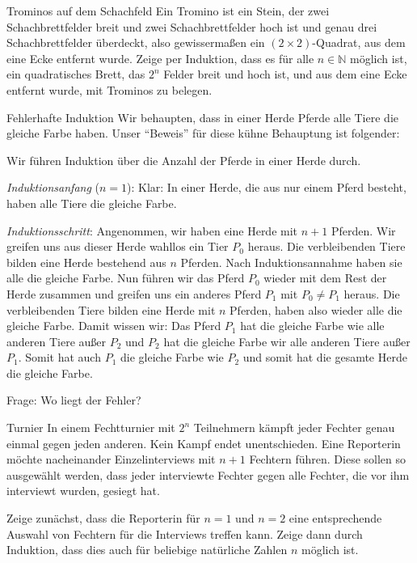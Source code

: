 \documentclass{uebungszettel}
\newcommand{\N}{\mathbb{N}} %
\begin{document}
\newpage

\begin{aufgabe}{Trominos auf dem Schachfeld}
  Ein Tromino ist ein Stein, der zwei Schachbrettfelder breit und zwei Schachbrettfelder hoch ist und genau drei Schachbrettfelder überdeckt, also gewissermaßen ein $(2 \times 2)$-Quadrat, aus dem eine Ecke entfernt wurde. Zeige per Induktion, dass es für alle $n \in \N$ möglich ist, ein quadratisches Brett, das $2^n$ Felder breit und hoch ist, und aus dem eine Ecke entfernt wurde, mit Trominos zu belegen.
\end{aufgabe}

\begin{aufgabe}{Fehlerhafte Induktion}
  Wir behaupten, dass in einer Herde Pferde alle Tiere die gleiche Farbe haben. Unser "`Beweis"' für diese kühne Behauptung ist folgender:

  Wir führen Induktion über die Anzahl der Pferde in einer Herde durch.

  \emph{Induktionsanfang} ($n=1$): Klar: In einer Herde, die aus nur einem Pferd besteht, haben alle Tiere die gleiche Farbe.

  \emph{Induktionsschritt}: Angenommen, wir haben eine Herde mit $n+1$ Pferden. Wir greifen uns aus dieser Herde wahllos ein Tier $P_0$ heraus. Die verbleibenden Tiere bilden eine Herde bestehend aus $n$ Pferden. Nach Induktionsannahme haben sie alle die gleiche Farbe. Nun führen wir das Pferd $P_0$ wieder mit dem Rest der Herde zusammen und greifen uns ein anderes Pferd $P_1$ mit $P_0 \not= P_1$ heraus. Die verbleibenden Tiere bilden eine Herde mit $n$ Pferden, haben also wieder alle die gleiche Farbe. Damit wissen wir: Das Pferd $P_1$ hat die gleiche Farbe wie alle anderen Tiere außer $P_2$ und $P_2$ hat die gleiche Farbe wir alle anderen Tiere außer $P_1$. Somit hat auch $P_1$ die gleiche Farbe wie $P_2$ und somit hat die gesamte Herde die gleiche Farbe.

  Frage: Wo liegt der Fehler?
\end{aufgabe}


\begin{aufgabe}{Turnier}
  In einem Fechtturnier mit $2^n$ Teilnehmern kämpft jeder Fechter genau einmal gegen jeden anderen. Kein Kampf endet unentschieden. Eine Reporterin möchte nacheinander Einzelinterviews mit $n+1$ Fechtern führen. Diese sollen so ausgewählt werden, dass jeder interviewte Fechter gegen alle Fechter, die vor ihm interviewt wurden, gesiegt hat.

  Zeige zunächst, dass die Reporterin für $n=1$ und $n=2$ eine entsprechende Auswahl von Fechtern für die Interviews treffen kann. Zeige dann durch Induktion, dass dies auch für beliebige natürliche Zahlen $n$ möglich ist.
\end{aufgabe}
\end{document}
